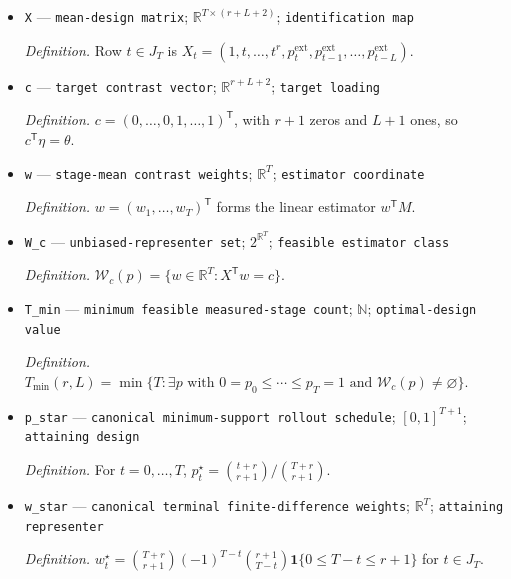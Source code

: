 \documentclass{article}
\begin{document}
\begin{itemize}
  \par\smallskip\noindent\emph{Definition.} \(\theta=\sum_{\ell=0}^{L}\beta_\ell=n^{-1}\sum_{i\in I_n}\sum_{\ell=0}^{L}b_{i,\ell}\).
  \item \texttt{X} --- \texttt{mean-\allowbreak{}design matrix}; \(\mathbb R^{T\times(r+L+2)}\); \texttt{identification map}
  \par\smallskip\noindent\emph{Definition.} Row \(t\in J_T\) is \(X_t=(1,t,\ldots,t^r,p^{\mathrm{ext}}_t,p^{\mathrm{ext}}_{t-1},\ldots,p^{\mathrm{ext}}_{t-L})\).
  \item \texttt{c} --- \texttt{target contrast vector}; \(\mathbb R^{r+L+2}\); \texttt{target loading}
  \par\smallskip\noindent\emph{Definition.} \(c=(0,\ldots,0,1,\ldots,1)^{\mathsf T}\), with \(r+1\) zeros and \(L+1\) ones, so \(c^{\mathsf T}\eta=\theta\).
  \item \texttt{w} --- \texttt{stage-\allowbreak{}mean contrast weights}; \(\mathbb R^T\); \texttt{estimator coordinate}
  \par\smallskip\noindent\emph{Definition.} \(w=(w_1,\ldots,w_T)^{\mathsf T}\) forms the linear estimator \(w^{\mathsf T}M\).
  \item \texttt{W\_\allowbreak{}c} --- \texttt{unbiased-\allowbreak{}representer set}; \(2^{\mathbb R^T}\); \texttt{feasible estimator class}
  \par\smallskip\noindent\emph{Definition.} \(\mathcal W_c(p)=\{w\in\mathbb R^T:X^{\mathsf T}w=c\}\).
  \item \texttt{T\_\allowbreak{}min} --- \texttt{minimum feasible measured-\allowbreak{}stage count}; \(\mathbb N\); \texttt{optimal-\allowbreak{}design value}
  \par\smallskip\noindent\emph{Definition.} \(T_{\min}(r,L)=\min\{T:\exists p\text{ with }0=p_0\le\cdots\le p_T=1\text{ and }\mathcal W_c(p)\ne\varnothing\}\).
  \item \texttt{p\_\allowbreak{}star} --- \texttt{canonical minimum-\allowbreak{}support rollout schedule}; \([0,1]^{T+1}\); \texttt{attaining design}
  \par\smallskip\noindent\emph{Definition.} For \(t=0,\ldots,T\), \(p_t^\star=\binom{t+r}{r+1}/\binom{T+r}{r+1}\).
  \item \texttt{w\_\allowbreak{}star} --- \texttt{canonical terminal finite-\allowbreak{}difference weights}; \(\mathbb R^T\); \texttt{attaining representer}
  \par\smallskip\noindent\emph{Definition.} \(w_t^\star=\binom{T+r}{r+1}(-1)^{T-t}\binom{r+1}{T-t}\mathbf 1\{0\le T-t\le r+1\}\) for \(t\in J_T\).

\end{itemize}
\end{document}
